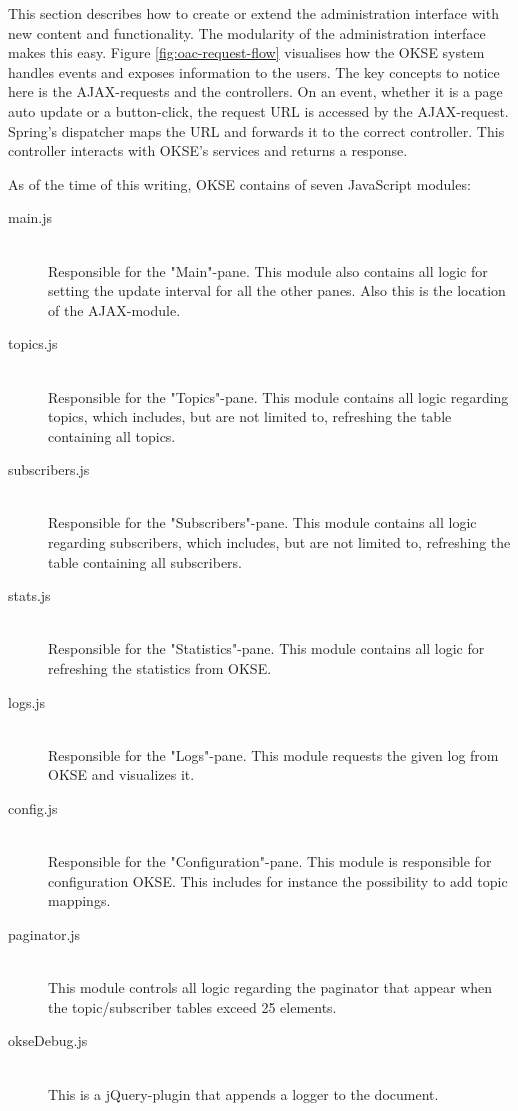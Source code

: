 This section describes how to create or extend the administration interface with new content and functionality. The modularity of the administration interface makes this easy. Figure \ref{fig:oac-request-flow} visualises how the OKSE system handles events and exposes information to the users. The key concepts to notice here is the AJAX-requests and the controllers. On an event, whether it is a page auto update or a button-click, the request URL is accessed by the AJAX-request. Spring's dispatcher maps the URL and forwards it to the correct controller. This controller interacts with OKSE's services and returns a response.

As of the time of this writing, OKSE contains of seven JavaScript modules: 

\begin{description}
    \item[main.js] \hfill \\ Responsible for the "Main"-pane. This module also contains all logic for setting the update interval for all the other panes. Also this is the location of the AJAX-module. 
    \item[topics.js] \hfill \\ Responsible for the "Topics"-pane. This module contains all logic regarding topics, which includes, but are not limited to, refreshing the table containing all topics. 
    \item[subscribers.js] \hfill \\ Responsible for the "Subscribers"-pane. This module contains all logic regarding subscribers, which includes, but are not limited to, refreshing the table containing all subscribers. 
    \item[stats.js] \hfill \\ Responsible for the "Statistics"-pane. This module contains all logic for refreshing the statistics from OKSE.
    \item[logs.js] \hfill \\ Responsible for the "Logs"-pane. This module requests the given log from OKSE and visualizes it.
    \item[config.js] \hfill \\ Responsible for the "Configuration"-pane. This module is responsible for configuration OKSE. This includes for instance the possibility to add topic mappings. 
    \item[paginator.js] \hfill \\ This module controls all logic regarding the paginator that appear when the topic/subscriber tables exceed 25 elements. 
    \item[okseDebug.js] \hfill \\ This is a jQuery-plugin that appends a logger to the document.
\end{description}

